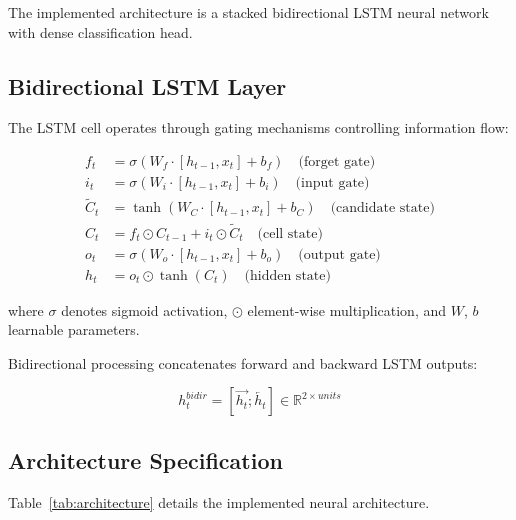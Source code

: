 \documentclass[12pt,a4paper]{report}
\begin{document}
The implemented architecture is a stacked bidirectional LSTM neural network with dense classification head.

\subsection{Bidirectional LSTM Layer}

The LSTM cell operates through gating mechanisms controlling information flow:

\begin{align}
    f_t &= \sigma(W_f \cdot [h_{t-1}, x_t] + b_f) \quad \text{(forget gate)} \\
    i_t &= \sigma(W_i \cdot [h_{t-1}, x_t] + b_i) \quad \text{(input gate)} \\
    \tilde{C}_t &= \tanh(W_C \cdot [h_{t-1}, x_t] + b_C) \quad \text{(candidate state)} \\
    C_t &= f_t \odot C_{t-1} + i_t \odot \tilde{C}_t \quad \text{(cell state)} \\
    o_t &= \sigma(W_o \cdot [h_{t-1}, x_t] + b_o) \quad \text{(output gate)} \\
    h_t &= o_t \odot \tanh(C_t) \quad \text{(hidden state)}
\end{align}

where $\sigma$ denotes sigmoid activation, $\odot$ element-wise multiplication, and $W$, $b$ learnable parameters.

Bidirectional processing concatenates forward and backward LSTM outputs:

\begin{equation}
    h_t^{bidir} = [\overrightarrow{h_t}; \overleftarrow{h_t}] \in \mathbb{R}^{2 \times units}
\end{equation}

\subsection{Architecture Specification}

Table~\ref{tab:architecture} details the implemented neural architecture.
\end{document}
